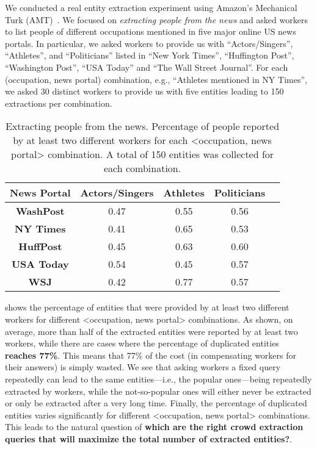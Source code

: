 We conducted a real entity extraction experiment using Amazon's Mechanical Turk (AMT)~\cite{mturk}. We focused on {\em extracting people from the news} and asked workers to list people of different occupations mentioned in five major online US news portals. In particular, we asked workers to provide us with ``Actors/Singers'', ``Athletes'', and ``Politicians'' listed in ``New York Times'', ``Huffington Post'', ``Washington Post'', ``USA  Today'' and ``The Wall Street Journal''. For each (occupation, news portal) combination, e.g., ``Athletes mentioned in NY Times'', we asked 30 distinct workers to provide us with five entities leading to 150 extractions per combination.

\vspace{10pt}\begin{table}[h]
\center
\vspace{-10pt}
\caption{Extracting people from the news. Percentage of people reported by at least two different workers for each <occupation, news portal> combination. A total of 150 entities was collected for each combination.}
\label{tab:duplicates}
\begin{tabular}{|c|c|c|c|c|}
\hline
News Portal & {\bf Actors/Singer}s & {\bf Athletes} & \textbf{Politicians}\\ \hline
{\bf WashPost} & 0.47 & 0.55 & 0.56 \\
{\bf NY Times} & 0.41& 0.65 & 0.53 \\
{\bf HuffPost} & 0.45 & 0.63 & 0.60 \\
{\bf USA Today} & 0.54 & 0.45 & 0.57 \\
{\bf WSJ} & 0.42 & 0.77 & 0.57 \\
\hline
\end{tabular}
\end{table}


 shows the percentage of entities that were provided by at least two different workers for different <occupation, news portal> combinations. As shown, on average, more than half of the extracted entities were reported by at least two workers, while there are cases where the percentage of duplicated entities {\bf reaches 77\%}. This means that 77\% of the cost (in compensating workers for their answers) is simply wasted. We see that asking workers a fixed query repeatedly can lead to the same entities---i.e., the popular ones---being repeatedly extracted by workers, while the not-so-popular ones will either never be extracted or only be extracted after a very long time. Finally, the percentage of duplicated entities varies significantly for different <occupation, news portal> combinations. This leads to the natural question of {\bf which are the right crowd extraction queries that will maximize the total number of extracted entities?}. 

